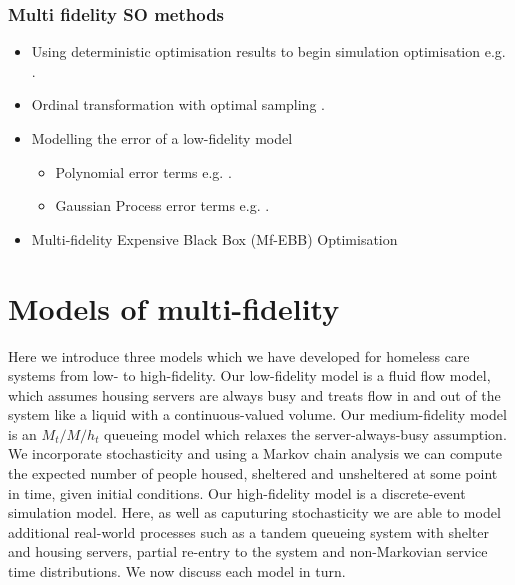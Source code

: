 \documentclass[12pt,a4paper]{article}
\begin{document}
\subsubsection{Multi fidelity SO methods}

\begin{itemize}[noitemsep]
\item Using deterministic optimisation results to begin simulation optimisation e.g. \cite{jian2015introduction}.
\item Ordinal transformation with optimal sampling \citep{xu2016mo2tos}.
\item Modelling the error of a low-fidelity model
\begin{itemize}[noitemsep]
\item Polynomial error terms e.g. \cite{chong2018simulation}.
\item Gaussian Process error terms e.g. \cite{huang2006sequential}.
\end{itemize}
\item Multi-fidelity Expensive Black Box (Mf-EBB) Optimisation
\end{itemize}

\newpage

\section{Models of multi-fidelity} \label{models}

Here we introduce three models which we have developed for homeless care systems from low- to high-fidelity. Our low-fidelity model is a fluid flow model, which assumes housing servers are always busy and treats flow in and out of the system like a liquid with a continuous-valued volume. Our medium-fidelity model is an $M_t/M/h_t$ queueing model which relaxes the server-always-busy assumption. We incorporate stochasticity and using a Markov chain analysis we can compute the expected number of people housed, sheltered and unsheltered at some point in time, given initial conditions. Our high-fidelity model is a discrete-event simulation model. Here, as well as caputuring stochasticity we are able to model additional real-world processes such as a tandem queueing system with shelter and housing servers, partial re-entry to the system and non-Markovian service time distributions. We now discuss each model in turn.
\end{document}
